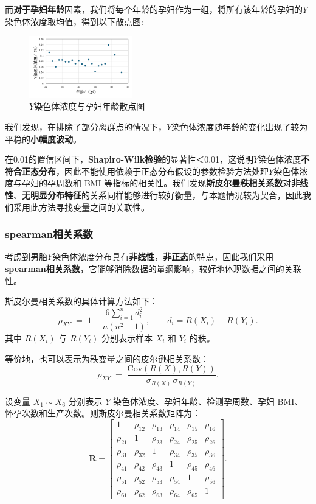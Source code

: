\documentclass[12pt]{ctexart}
\begin{document}
	而\textbf{对于孕妇年龄}因素，我们将每个年龄的孕妇作为一组，将所有该年龄的孕妇的$Y$染色体浓度取均值，得到以下散点图:
	\begin{figure}[H]
		\centering
		\includegraphics[width=0.4\textwidth]{age.png} %
		\caption{$Y$染色体浓度与孕妇年龄散点图}
		\label{fig:example}
	\end{figure}
	
	我们发现，在排除了部分离群点的情况下，$Y$染色体浓度随年龄的变化出现了较为平稳的\textbf{小幅度波动}。
	
	
	在0.01的置信区间下，\textbf{Shapiro-Wilk检验}的显著性＜0.01，这说明$Y$染色体浓度\textbf{不符合正态分布}，因此不能使用依赖于正态分布假设的参数检验方法处理$Y$染色体浓度与孕妇的孕周数和 BMI 等指标的相关性。我们发现\textbf{斯皮尔曼秩相关系数}对\textbf{非线性}、\textbf{无明显分布特征}的关系同样能够进行较好衡量，与本题情况较为契合，因此我们采用此方法寻找变量之间的关联性。
	
	\subsubsection{spearman相关系数}
	考虑到男胎$Y$染色体浓度分布具有\textbf{非线性}，\textbf{非正态}的特点，因此我们采用\textbf{spearman相关系数}，它能够消除数据的量纲影响，较好地体现数据之间的关联性。
	
	斯皮尔曼相关系数的具体计算方法如下：
	\begin{equation}
		\rho_{XY} \;=\; 1 - \frac{6\sum_{i=1}^n d_i^2}{n(n^2-1)}, 
		\qquad d_i = R(X_i) - R(Y_i).
	\end{equation}
	其中 $R(X_i)$ 与 $R(Y_i)$ 分别表示样本 $X_i$ 和 $Y_i$ 的秩。
	
	等价地，也可以表示为秩变量之间的皮尔逊相关系数：
	\begin{equation}
		\rho_{XY} \;=\; \frac{\mathrm{Cov}(R(X), R(Y))}{\sigma_{R(X)} \, \sigma_{R(Y)}}.
	\end{equation}
	
	设变量 $X_1 \sim X_6$ 分别表示 $Y$ 染色体浓度、孕妇年龄、检测孕周数、孕妇 BMI、怀孕次数和生产次数。则斯皮尔曼相关系数矩阵为：
	\begin{equation}
		\mathbf{R} =
		\begin{bmatrix}
			1 & \rho_{12} & \rho_{13} & \rho_{14} & \rho_{15} & \rho_{16} \\
			\rho_{21} & 1 & \rho_{23} & \rho_{24} & \rho_{25} & \rho_{26} \\
			\rho_{31} & \rho_{32} & 1 & \rho_{34} & \rho_{35} & \rho_{36} \\
			\rho_{41} & \rho_{42} & \rho_{43} & 1 & \rho_{45} & \rho_{46} \\
			\rho_{51} & \rho_{52} & \rho_{53} & \rho_{54} & 1 & \rho_{56} \\
			\rho_{61} & \rho_{62} & \rho_{63} & \rho_{64} & \rho_{65} & 1
		\end{bmatrix}.
	\end{equation}
	
\end{document}
